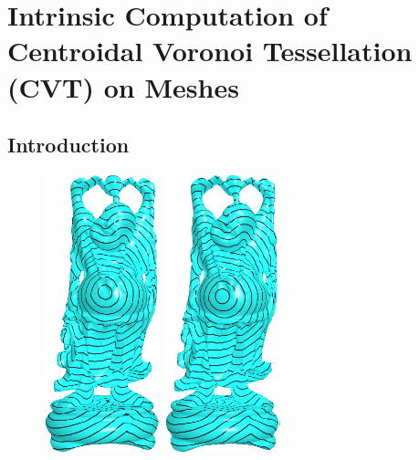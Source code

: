 \chapter{Intrinsic Computation of Centroidal Voronoi Tessellation (CVT) on Meshes}

\section{Introduction}
\label{sec:introduction}

\begin{figure}[htbp]
\centering
\includegraphics[width=0.3\textwidth]{figs/svg/buddha_nf40k_svg_RMS_0_16.png}
\includegraphics[width=0.3\textwidth]{figs/svg/buddha_nf300k_svg_RMS_0_11.png}

\end{figure}
